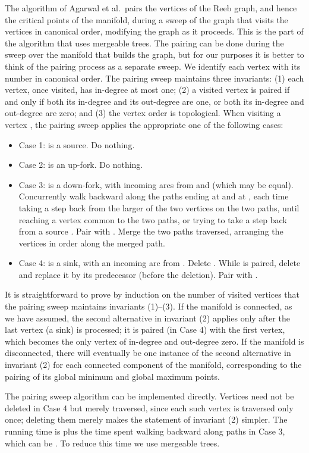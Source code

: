 \documentclass[twoside,leqno,twocolumn]{article}
\begin{document}
The algorithm of Agarwal et al.\ pairs the vertices of the Reeb graph, and hence the critical points of the manifold, during a sweep of the graph that visits the vertices in canonical order, modifying the graph as it proceeds.  This is the part of the algorithm that uses mergeable trees.  The pairing can be done during the sweep over the manifold that builds the graph, but for our purposes it is better to think of the pairing process as a separate sweep.  We identify each vertex with its number in canonical order.  The pairing sweep maintains three invariants: (1) each vertex, once visited, has in-degree at most one; (2) a visited vertex is paired if and only if both its in-degree and its out-degree are one, or both its in-degree and out-degree are zero; and (3) the vertex order is topological.  When visiting a vertex , the pairing sweep applies the appropriate one of the following cases:
\begin{itemize}
\item Case 1:  is a source. Do nothing.
\item Case 2:  is an up-fork. Do nothing.
\item Case 3:  is a down-fork, with incoming arcs from  and  (which may be equal).  Concurrently walk backward along the paths ending at  and at , each time taking a step back from the larger of the two vertices on the two paths, until reaching a vertex  common to the two paths, or trying to take a step back from a source .  Pair  with .  Merge the two paths traversed, arranging the vertices in order along the merged path.
\item Case 4:  is a sink, with an incoming arc from .  Delete .  While  is paired, delete  and replace it by its predecessor (before the deletion).  Pair  with .
\end{itemize}

It is straightforward to prove by induction on the number of visited vertices that the pairing sweep maintains invariants (1)--(3).  If the manifold is connected, as we have assumed, the second alternative in invariant (2) applies only after the last vertex (a sink) is processed; it is paired (in Case 4) with the first vertex, which becomes the only vertex of in-degree and out-degree zero.  If the manifold is disconnected, there will eventually be one instance of the second alternative in invariant (2) for each connected component of the manifold, corresponding to the pairing of its global minimum and global maximum points.

The pairing sweep algorithm can be implemented directly.  Vertices need not be deleted in Case 4 but merely traversed, since each such vertex is traversed only once; deleting them merely makes the statement of invariant (2) simpler.  The running time is  plus the time spent walking backward along paths in Case 3, which can be .  To reduce this time we use mergeable trees.
\end{document}
